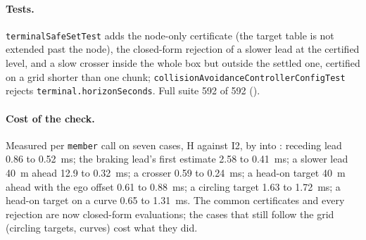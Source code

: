 \documentclass[11pt]{article}
\begin{document}
\paragraph{Tests.} \texttt{terminalSafeSetTest} adds the node-only certificate
(the target table is not extended past the node), the closed-form rejection of
a slower lead at the certified level, and a slow crosser inside the whole box
but outside the settled one, certified on a grid shorter than one chunk;
\texttt{collisionAvoidanceControllerConfigTest} rejects
\texttt{terminal.horizonSeconds}. Full suite 592 of 592 ().

\paragraph{Cost of the check.} Measured per \texttt{member} call on seven
cases, H against I2, by  into
: receding lead 0.86 to 0.52~ms; the braking
lead's first estimate 2.58 to 0.41~ms; a slower lead 40~m ahead 12.9 to
0.32~ms; a crosser 0.59 to 0.24~ms; a head-on target 40~m ahead with the ego
offset 0.61 to 0.88~ms; a circling target 1.63 to 1.72~ms; a head-on target
on a curve 0.65 to 1.31~ms. The common certificates and every rejection are
now closed-form evaluations; the cases that still follow the grid (circling
targets, curves) cost what they did.
\end{document}
